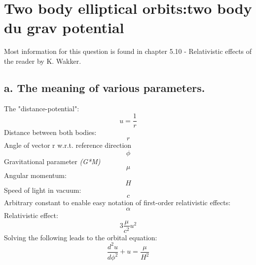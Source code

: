 \section{ Two body elliptical orbits:two body du grav potential  }\label{sec:q3}    
Most information for this question is found in chapter 5.10 - Relativistic effects of the reader by K. Wakker.

\bigskip

\subsection{a. The meaning of various parameters.}
The "distance-potential":
\begin{equation}
u = \frac{1}{r}
\end{equation}
Distance between both bodies:
\begin{equation}
r
\end{equation}
Angle of vector r w.r.t. reference direction
\begin{equation}
\phi
\end{equation}
Gravitational parameter \textit{(G*M)}
\begin{equation}
\mu
\end{equation}
Angular momentum:
\begin{equation}
H
\end{equation}
Speed of light in vacuum:
\begin{equation}
c
\end{equation}
Arbitrary constant to enable easy notation of first-order relativistic effects:
\begin{equation}
\alpha
\end{equation}
Relativistic effect:
\begin{equation}
3\frac{\mu}{c^2}u^2
\end{equation}
Solving the following leads to the orbital equation:
\begin{equation}
\frac{d^2u}{d\phi^2} + u = \frac{\mu}{H^2}
\end{equation}
